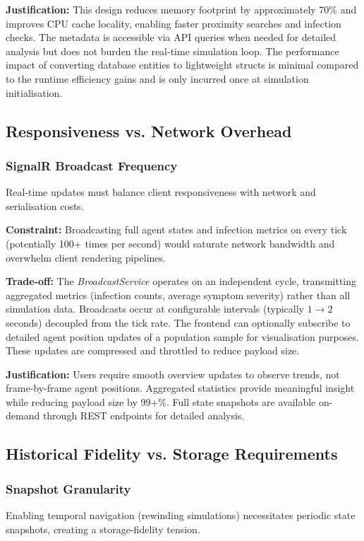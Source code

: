 \textbf{Justification:} This design reduces memory footprint by approximately 70\% and improves CPU cache locality, enabling faster proximity searches and infection checks. The metadata is accessible via API queries when needed for detailed analysis but does not burden the real-time simulation loop. The performance impact of converting database entities to lightweight structs is minimal compared to the runtime efficiency gains and is only incurred once at simulation initialisation.

\subsection{Responsiveness vs. Network Overhead}

\subsubsection*{SignalR Broadcast Frequency}
Real-time updates must balance client responsiveness with network and serialisation costs.

\textbf{Constraint:} Broadcasting full agent states and infection metrics on every tick (potentially 100+ times per second) would saturate network bandwidth and overwhelm client rendering pipelines.

\textbf{Trade-off:} The \textit{BroadcastService} operates on an independent cycle, transmitting aggregated metrics (infection counts, average symptom severity) rather than all simulation data. Broadcasts occur at configurable intervals (typically $1 \rightarrow 2$ seconds) decoupled from the tick rate. The frontend can optionally subscribe to detailed agent position updates of a population sample for visualisation purposes. These updates are compressed and throttled to reduce payload size.

\textbf{Justification:} Users require smooth overview updates to observe trends, not frame-by-frame agent positions. Aggregated statistics provide meaningful insight while reducing payload size by 99+\%. Full state snapshots are available on-demand through REST endpoints for detailed analysis.

\subsection{Historical Fidelity vs. Storage Requirements}

\subsubsection*{Snapshot Granularity}
Enabling temporal navigation (rewinding simulations) necessitates periodic state snapshots, creating a storage-fidelity tension.

